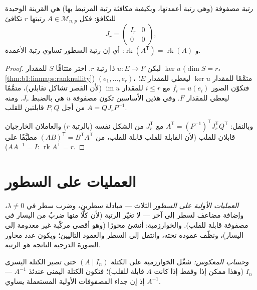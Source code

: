 \begin{theorem}\label{thm:b1:matrices:rank}
\emph{رتبة} مصفوفة (وهي رتبة أعمدتها، وبكيفية مكافئة
رتبة  المرتبط بها) هي القرينة الوحيدة للتكافؤ:
فكل $A \in \mathcal{M}_{n,p}$ رتبتها $r$ تكافئ
\[
J_r = \begin{pmatrix} I_r & 0 \\ 0 & 0 \end{pmatrix},
\]
و $\operatorname{rk}(A^{\mathsf T}) = \operatorname{rk}(A)$: أي إن رتبة السطور
تساوي رتبة الأعمدة.
\end{theorem}

\begin{proof}
ليكن $u \colon E \to F$ ذا رتبة $r$. اختر متتامًّا $S$ للمقدار
$\ker u$ ($\dim S = r$، \cref{thm:b1:linmaps:ranknullity}) 
$(e_1, \dots, e_r)$، متمَّمًا  للمقدار $\ker u$ ليعطي
 للمقدار $E$؛ فتكوّن الصور $f_i = u(e_i)$ مع $i \leq r$  للمقدار
$\operatorname{im} u$ (لأن القصر تشاكل تقابلي)، متمَّمًا
ليعطي  للمقدار $F$. وفي هذين الأساسين تكون مصفوفة $u$ هي بالضبط
$J_r$. ومنه $A = Q J_r P^{-1}$ من أجل $P, Q$ قابلتين للقلب.

وبالنقل: $A^{\mathsf T} = (P^{-1})^{\mathsf T} J_r^{\mathsf T} Q^{\mathsf T}$
مع $J_r^{\mathsf T}$ من الشكل نفسه (بالرتبة $r$) والعاملان
الخارجيان قابلان للقلب (لأن  القابلة للقلب قابلة للقلب، من
$(AB)^{\mathsf T} = B^{\mathsf T}A^{\mathsf T}$ مطبَّقًا على $AA^{-1} = I$):
$\operatorname{rk} A^{\mathsf T} = r$.
\end{proof}

\section{العمليات على السطور}

\begin{method}\label{met:b1:matrices:gauss}
\emph{العمليات الأولية على السطور} الثلاث ---
مبادلة سطرين، وضرب سطر في $\lambda \neq 0$، وإضافة مضاعف
لسطر إلى آخر --- لا تغيّر الرتبة (لأن كلًّا منها ضربٌ
من اليسار في مصفوفة قابلة للقلب). والخوارزمية: أنشئ محورًا
(وهو أقصى مركّبة غير معدومة إلى اليسار)، ونظّف عموده تحته، وانتقل إلى السطر
والعمود التاليين؛ ويكون عدد محاور الصورة الدرجية الناتجة
هو الرتبة.

\emph{وحساب المعكوس:} شغّل الخوارزمية على الكتلة $(A \mid
I_n)$ حتى تصير الكتلة اليسرى $I_n$ (وهذا ممكن إذا وفقط إذا كانت $A$
قابلة للقلب)؛ فتكون الكتلة اليمنى عندئذ $A^{-1}$ --- إذ إن جداء
المصفوفات الأولية المستعملة يساوي $A^{-1}$.
\end{method}

